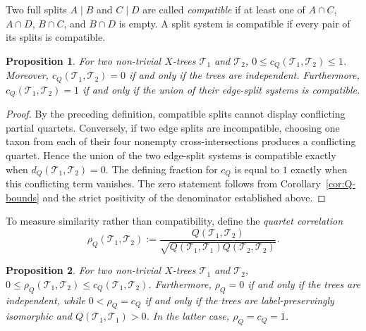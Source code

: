 \documentclass[pdflatex,sn-mathphys-num]{sn-jnl}
\theoremstyle{thmstyleone}
\newtheorem{proposition}{Proposition}
\begin{document}
Two full splits $A\mid B$ and $C\mid D$ are called \emph{compatible} if
at least one of $A\cap C$, $A\cap D$, $B\cap C$, and $B\cap D$ is empty.
A split system is compatible if every pair of its splits is compatible.

\begin{proposition}\label{prop:compatibility}
For two non-trivial $X$-trees $\mathcal T_1$ and $\mathcal T_2$,
$0\le c_Q(\mathcal T_1,\mathcal T_2)\le1$.  Moreover,
$c_Q(\mathcal T_1,\mathcal T_2)=0$ if and only if the trees are
independent.  Furthermore, $c_Q(\mathcal T_1,\mathcal T_2)=1$ if and only if
the union of their edge-split systems is compatible.
\end{proposition}

\begin{proof}
By the preceding definition, compatible splits cannot display
conflicting partial quartets.  Conversely, if two edge splits are
incompatible, choosing one taxon from each of their four nonempty
cross-intersections produces a conflicting quartet.  Hence the union of the
two edge-split systems is compatible exactly when
$d_Q(\mathcal T_1,\mathcal T_2)=0$.  The defining fraction for $c_Q$ is equal
to $1$ exactly when this conflicting term
vanishes.  The zero statement follows from Corollary~\ref{cor:Q-bounds} and
the strict positivity of the denominator established above.
\end{proof}

To measure similarity rather than compatibility, define the
\emph{quartet correlation}
\[
\rho_Q(\mathcal T_1,\mathcal T_2):=
\frac{Q(\mathcal T_1,\mathcal T_2)}
{\sqrt{Q(\mathcal T_1,\mathcal T_1)Q(\mathcal T_2,\mathcal T_2)}}.
\]

\begin{proposition}\label{prop:correlation}
For two non-trivial $X$-trees $\mathcal T_1$ and $\mathcal T_2$,
$0\le\rho_Q(\mathcal T_1,\mathcal T_2)
\le c_Q(\mathcal T_1,\mathcal T_2)$.
Furthermore, $\rho_Q=0$ if and only if the trees are independent, while
$0<\rho_Q=c_Q$ if and only if the trees are label-preservingly isomorphic
and $Q(\mathcal T_1,\mathcal T_1)>0$.  In the latter case,
$\rho_Q=c_Q=1$.
\end{proposition}
\end{document}

